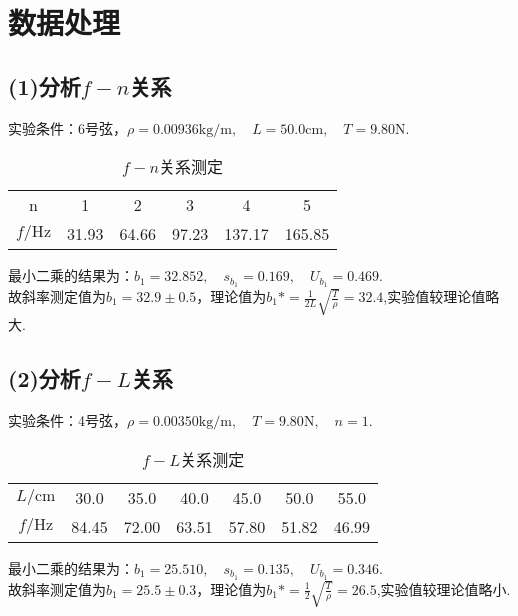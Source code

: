 \documentclass{ctexart}
\begin{document}
\section{数据处理}
\clearpage
\subsection*{(1)分析$f-n$关系}
\noindent 实验条件：6号弦，$\rho=0.00936\mathrm{kg/m},\quad L=50.0\mathrm{cm},\quad T=9.80\mathrm{N}$.\\

\begin{table}[h]
  \caption{$f-n$关系测定} \vspace{0.7em}
  \centering
  \begin{tabular}{cccccc}
    \hline
    n& 1& 2& 3& 4& 5\\
    $f/\mathrm{Hz}$& 31.93 & 64.66 & 97.23 & 137.17 & 165.85 \\
    \hline
    \end{tabular}
\end{table}

\noindent 最小二乘的结果为：$b_1=32.852
,\quad s_{b_1}=0.169, \quad U_{b_1}=0.469$. \\
故斜率测定值为$b_1=32.9\pm0.5$，理论值为$b_1*=\frac{1}{2L}\sqrt{\frac{T}{\rho}}=32.4$,实验值较理论值略大.\\

\subsection*{(2)分析$f-L$关系}
\noindent 实验条件：4号弦，$\rho=0.00350\mathrm{kg/m},\quad T=9.80\mathrm{N},\quad n=1$.\\
\begin{table}[h]
  \caption{$f-L$关系测定} \vspace{0.7em}
  \centering
  \begin{tabular}{ccccccc}
    \hline
    $L/\mathrm{cm}$& 30.0& 35.0& 40.0& 45.0& 50.0& 55.0\\
    $f/\mathrm{Hz}$& 84.45 & 72.00 & 63.51 & 57.80 & 51.82 & 46.99\\
    \hline
    \end{tabular}
\end{table}

\noindent 最小二乘的结果为：$b_1=25.510
,\quad s_{b_1}=0.135, \quad U_{b_1}=0.346$. \\
故斜率测定值为$b_1=25.5\pm0.3$，理论值为$b_1*=\frac{1}{2}\sqrt{\frac{T}{\rho}}=26.5$,实验值较理论值略小.\\
\end{document}
